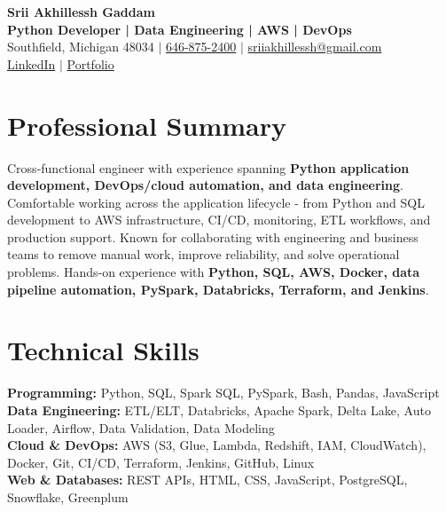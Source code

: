 \documentclass[letterpaper,10pt]{article}
\begin{document}
\fontsize{9.35pt}{10.45pt}\selectfont

\begin{center}
    {\LARGE \textbf{Srii Akhillessh Gaddam}} \\[-1pt]
    \textbf{Python Developer | Data Engineering | AWS | DevOps} \\[2pt]
    Southfield, Michigan 48034 $|$
    \href{tel:6468752400}{646-875-2400} $|$
    \href{mailto:sriiakhillessh@gmail.com}{sriiakhillessh@gmail.com} \\[1pt]
    \href{https://www.linkedin.com/in/srii-akhiilessh-gaddam-b48668191/}{LinkedIn} $|$
    \href{https://sriiakhillesshg.github.io/portfolio/}{Portfolio}
\end{center}
\vspace{-8pt}

\section{Professional Summary}
\small{Cross-functional engineer with experience spanning \textbf{Python application development, DevOps/cloud automation, and data engineering}. Comfortable working across the application lifecycle - from Python and SQL development to AWS infrastructure, CI/CD, monitoring, ETL workflows, and production support. Known for collaborating with engineering and business teams to remove manual work, improve reliability, and solve operational problems. Hands-on experience with \textbf{Python, SQL, AWS, Docker, data pipeline automation, PySpark, Databricks, Terraform, and Jenkins}.}

\section{Technical Skills}
\small{
\textbf{Programming:} Python, SQL, Spark SQL, PySpark, Bash, Pandas, JavaScript \\
\textbf{Data Engineering:} ETL/ELT, Databricks, Apache Spark, Delta Lake, Auto Loader, Airflow, Data Validation, Data Modeling \\
\textbf{Cloud \& DevOps:} AWS (S3, Glue, Lambda, Redshift, IAM, CloudWatch), Docker, Git, CI/CD, Terraform, Jenkins, GitHub, Linux \\
\textbf{Web \& Databases:} REST APIs, HTML, CSS, JavaScript, PostgreSQL, Snowflake, Greenplum
}
\end{document}
